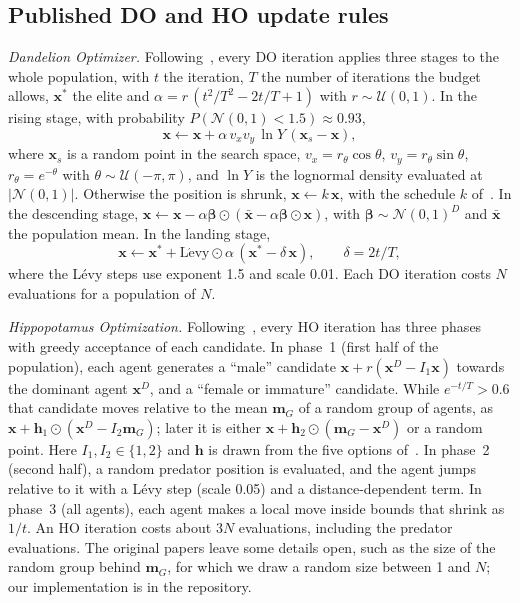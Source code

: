 \documentclass[journal]{IEEEtran}
\begin{document}
\subsection{Published DO and HO update rules}
\emph{Dandelion Optimizer.} Following~\cite{zhao2022do}, every DO iteration applies three stages to the whole population, with $t$ the iteration, $T$ the number of iterations the budget allows, $\mathbf{x}^\ast$ the elite and $\alpha=r\,(t^2/T^2-2t/T+1)$ with $r\sim\mathcal{U}(0,1)$. In the rising stage, with probability $P(\mathcal{N}(0,1)<1.5)\approx0.93$,
\begin{equation}
\mathbf{x}\leftarrow\mathbf{x}+\alpha\,v_xv_y\,\ln Y\,(\mathbf{x}_s-\mathbf{x}),
\end{equation}
where $\mathbf{x}_s$ is a random point in the search space, $v_x=r_\theta\cos\theta$, $v_y=r_\theta\sin\theta$, $r_\theta=e^{-\theta}$ with $\theta\sim\mathcal{U}(-\pi,\pi)$, and $\ln Y$ is the lognormal density evaluated at $|\mathcal{N}(0,1)|$. Otherwise the position is shrunk, $\mathbf{x}\leftarrow k\,\mathbf{x}$, with the schedule $k$ of~\cite{zhao2022do}. In the descending stage, $\mathbf{x}\leftarrow\mathbf{x}-\alpha\boldsymbol{\beta}\odot(\bar{\mathbf{x}}-\alpha\boldsymbol{\beta}\odot\mathbf{x})$, with $\boldsymbol{\beta}\sim\mathcal{N}(0,1)^D$ and $\bar{\mathbf{x}}$ the population mean. In the landing stage,
\begin{equation}
\mathbf{x}\leftarrow\mathbf{x}^\ast+\mathrm{L\acute{e}vy}\odot\alpha\,(\mathbf{x}^\ast-\delta\,\mathbf{x}),\qquad \delta=2t/T,
\end{equation}
where the Lévy steps use exponent 1.5 and scale 0.01. Each DO iteration costs $N$ evaluations for a population of $N$.

\emph{Hippopotamus Optimization.} Following~\cite{amiri2024ho}, every HO iteration has three phases with greedy acceptance of each candidate. In phase~1 (first half of the population), each agent generates a ``male'' candidate $\mathbf{x}+r(\mathbf{x}^{D}-I_1\mathbf{x})$ towards the dominant agent $\mathbf{x}^{D}$, and a ``female or immature'' candidate. While $e^{-t/T}>0.6$ that candidate moves relative to the mean $\mathbf{m}_G$ of a random group of agents, as $\mathbf{x}+\mathbf{h}_1\odot(\mathbf{x}^{D}-I_2\mathbf{m}_G)$; later it is either $\mathbf{x}+\mathbf{h}_2\odot(\mathbf{m}_G-\mathbf{x}^{D})$ or a random point. Here $I_1,I_2\in\{1,2\}$ and $\mathbf{h}$ is drawn from the five options of~\cite{amiri2024ho}. In phase~2 (second half), a random predator position is evaluated, and the agent jumps relative to it with a Lévy step (scale 0.05) and a distance-dependent term. In phase~3 (all agents), each agent makes a local move inside bounds that shrink as $1/t$. An HO iteration costs about $3N$ evaluations, including the predator evaluations. The original papers leave some details open, such as the size of the random group behind $\mathbf{m}_G$, for which we draw a random size between 1 and $N$; our implementation is in the repository.
\end{document}
